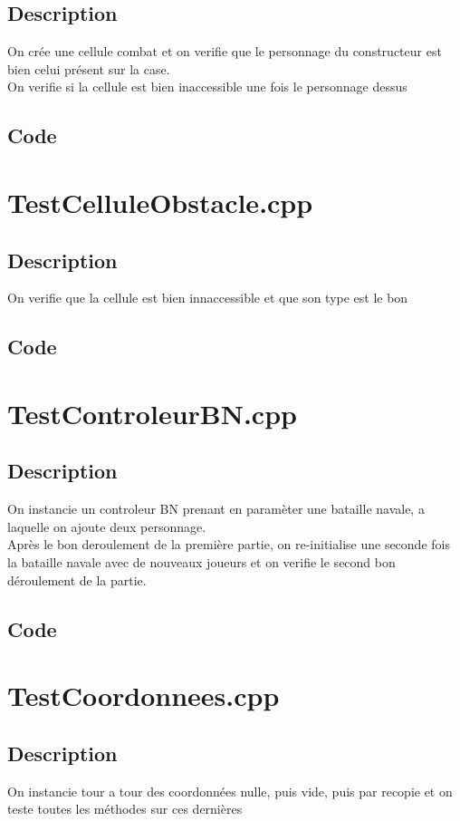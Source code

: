         \subsection{Description}
            On crée une cellule combat et on verifie que le personnage du constructeur est bien celui présent sur la case.\\
            On verifie si la cellule est bien inaccessible une fois le personnage dessus
        \subsection{Code}
    \section{TestCelluleObstacle.cpp}
        \subsection{Description}
            On verifie que la cellule est bien innaccessible et que son type est le bon
        \subsection{Code}
    \section{TestControleurBN.cpp}
        \subsection{Description}
            On instancie un controleur BN prenant en paramèter une bataille navale, a laquelle on ajoute deux personnage.\\
            Après le bon deroulement de la première partie, on re-initialise une seconde fois la bataille navale avec de nouveaux joueurs et on verifie le second bon déroulement de la partie.
        \subsection{Code}
    \section{TestCoordonnees.cpp}
        \subsection{Description}
            On instancie tour a tour des coordonnées nulle, puis vide, puis par recopie et on teste toutes les méthodes sur ces dernières
